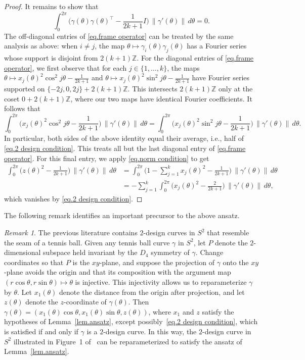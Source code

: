 \documentclass[12pt]{article}
\theoremstyle{plain}
\theoremstyle{definition}
\theoremstyle{remark}
\newtheorem{rem}[thm]{Remark}
\begin{document}
\begin{proof}
It remains to show that
\begin{equation}
\label{eq.frame operator}
\int_0^{2\pi}\bigg(\gamma(\theta)\gamma(\theta)^\top-\frac{1}{2k+1}I\bigg)\,\|\gamma'(\theta)\|\,d\theta
=0.
\end{equation}
The off-diagonal entries of \eqref{eq.frame operator} can be treated by the same analysis as above: when $i\neq j$, the map $\theta\mapsto\gamma_i(\theta)\gamma_j(\theta)$ has a Fourier series whose support is disjoint from $2(k+1)\mathbb{Z}$.
For the diagonal entries of \eqref{eq.frame operator}, we first observe that for each $j\in\{1,\ldots,k\}$, the maps $\theta\mapsto x_j(\theta)^2\cos^2j\theta-\frac{1}{2k+1}$ and $\theta\mapsto x_j(\theta)^2\sin^2j\theta-\frac{1}{2k+1}$ have Fourier series supported on $\{-2j,0,2j\}+2(k+1)\mathbb{Z}$.
This intersects $2(k+1)\mathbb{Z}$ only at the coset $0+2(k+1)\mathbb{Z}$, where our two maps have identical Fourier coefficients.
It follows that
\[
\int_0^{2\pi}\bigg(x_j(\theta)^2\cos^2j\theta-\frac{1}{2k+1}\bigg)\,\|\gamma'(\theta)\|\,d\theta
=\int_0^{2\pi}\bigg(x_j(\theta)^2\sin^2j\theta-\frac{1}{2k+1}\bigg)\,\|\gamma'(\theta)\|\,d\theta.
\]
In particular, both sides of the above identity equal their average, i.e., half of \eqref{eq.2 design condition}.
This treats all but the last diagonal entry of \eqref{eq.frame operator}.
For this final entry, we apply \eqref{eq.norm condition} to get
\begin{align*}
\int_0^{2\pi}\bigg(z(\theta)^2-\frac{1}{2k+1}\bigg)\,\|\gamma'(\theta)\|\,d\theta
&=\int_0^{2\pi}\bigg(1-\sum_{j=1}^kx_j(\theta)^2-\frac{1}{2k+1}\bigg)\,\|\gamma'(\theta)\|\,d\theta\\
&=-\sum_{j=1}^k\int_0^{2\pi}\bigg(x_j(\theta)^2-\frac{2}{2k+1}\bigg)\,\|\gamma'(\theta)\|\,d\theta,
\end{align*}
which vanishes by \eqref{eq.2 design condition}.
\end{proof}

The following remark identifies an important precursor to the above ansatz.

\begin{rem}
The previous literature contains $2$-design curves in $S^2$ that resemble the seam of a tennis ball.
Given any tennis ball curve $\gamma$ in $S^2$, let $P$ denote the $2$-dimensional subspace held invariant by the $D_4$ symmetry of $\gamma$.
Change coordinates so that $P$ is the $xy$-plane, and suppose the projection of $\gamma$ onto the $xy$-plane avoids the origin and that its composition with the argument map $(r\cos\theta,r\sin\theta)\mapsto\theta$ is injective.
This injectivity allows us to reparameterize $\gamma$ by $\theta$.
Let $x_1(\theta)$ denote the distance from the origin after projection, and let $z(\theta)$ denote the $z$-coordinate of $\gamma(\theta)$.
Then $\gamma(\theta)=(x_1(\theta)\cos\theta,x_1(\theta)\sin\theta,z(\theta))$, where $x_1$ and $z$ satisfy the hypotheses of Lemma~\ref{lem.ansatz}, except possibly~\eqref{eq.2 design condition}, which is satisfied if and only if $\gamma$ is a $2$-design curve.
In this way, the $2$-design curve in $S^2$ illustrated in Figure~1 of~\cite{EhlerG:23} can be reparameterized to satisfy the ansatz of Lemma~\ref{lem.ansatz}.
\end{rem}
\end{document}

